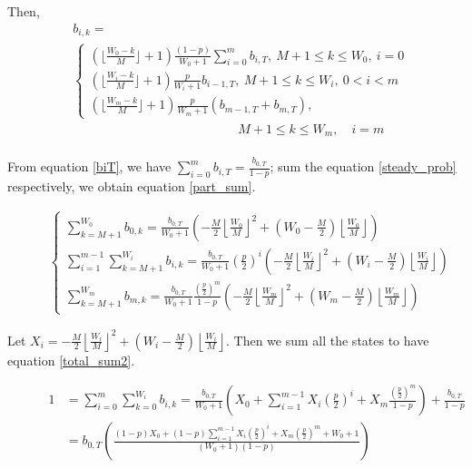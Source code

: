 \documentclass[journal]{IEEEtran}
\newcounter{MYtempeqncnt}
\begin{document}
Then,
\begin{align}
&b_{i,k} =  \nonumber \\
&
\begin{cases}
(\lfloor \frac{W_0-k}{M} \rfloor+1)\frac{(1-p)}{W_0+1}\sum_{i=0}^m b_{i,T}, \  M+1\leq k\leq W_0,\ i = 0\\[3pt]
(\lfloor \frac{W_i-k}{M} \rfloor+1)\frac{p}{W_i+1}b_{i-1,T}, 				\	 M+1 \leq k\leq W_i, \ 0<i<m \\[3pt]
(\lfloor \frac{W_m-k}{M} \rfloor+1)\frac{p}{W_m+1} (b_{m-1,T}+b_{m,T}), 	
\end{cases}\nonumber
\\ &\qquad \qquad \qquad \qquad \quad \qquad \qquad M+1 \leq k\leq W_m, \quad i = m \nonumber \\
\label{steady_prob}
\end{align}

From equation \ref{biT}, we have $\sum_{i=0}^m b_{i,T}= \frac{b_{0,T}}{1-p}$; sum the equation \ref{steady_prob} respectively, we obtain equation \ref{part_sum}.  
\begin{figure}[!t]

\begin{align}
\begin{cases}
\sum_{k=M+1}^{W_0} b_{0,k} = \frac{b_{0,T}}{W_0+1}\left(-\frac{M}{2}\left\lfloor \frac{W_0}{M}\right\rfloor ^2 + \left(W_0-\frac{M}{2}\right)\left\lfloor \frac{W_0}{M} \right\rfloor \right) \\[8pt]
\sum_{i=1}^{m-1}\sum_{k=M+1}^{W_i} b_{i,k} = \frac{b_{0,T}}{W_0+1}\left(\frac{p}{2}\right)^i \left(-\frac{M}{2}\left\lfloor \frac{W_i}{M}\right\rfloor ^2 + \left(W_i-\frac{M}{2}\right)\left\lfloor \frac{W_i}{M} \right\rfloor \right) \\[8pt]
\sum_{k=M+1}^{W_m} b_{m,k} = \frac{b_{0,T}}{W_0+1}\frac{(\frac{p}{2})^m}{1-p}\left(-\frac{M}{2}\left\lfloor \frac{W_m}{M}\right\rfloor ^2 + \left(W_m-\frac{M}{2}\right)\left\lfloor \frac{W_m}{M} \right\rfloor \right) 
\end{cases}
\label{part_sum}
\end{align}
\end{figure}

Let $X_i = -\frac{M}{2}\left\lfloor \frac{W_i}{M}\right\rfloor ^2 + \left(W_i-\frac{M}{2}\right)\left\lfloor \frac{W_i}{M} \right\rfloor$. Then we sum all the states to have equation \ref{total_sum2}.

\begin{figure}[!t]
\begin{align}
1 &= \sum_{i=0}^m \sum_{k=0}^{W_i}b_{i,k} 
 = \frac{b_{0,T}}{W_0+1}\left( X_0 + \sum_{i=1}^{m-1}X_i\left( \frac{p}{2}\right)^i + X_m\frac{\left( \frac{p}{2}\right)^m}{1-p}\right) + \frac{b_{0,T}}{1-p}\label{total_sum}\\
& = b_{0,T}\left( \frac{(1-p)X_0+(1-p) \sum_{i=1}^{m-1}X_i\left( \frac{p}{2}\right)^i+X_m\left( \frac{p}{2}\right)^m+W_0+1}{(W_0+1)(1-p)}\right)\label{total_sum2}
\end{align}
\hrulefill
\end{figure}
\end{document}
